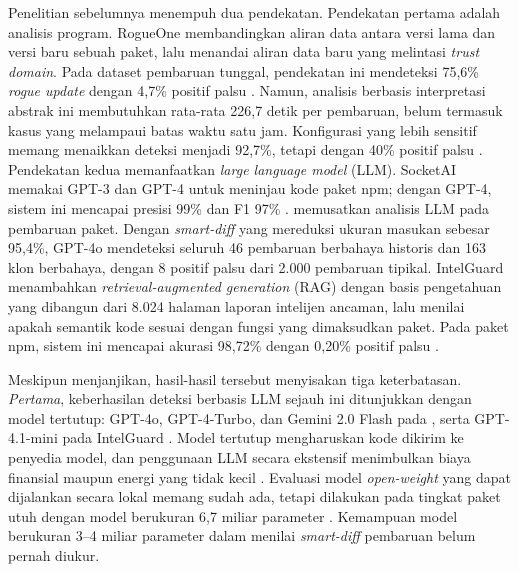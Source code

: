 \documentclass[a4paper,fleqn]{cas-dc}
\begin{document}
Penelitian sebelumnya menempuh dua pendekatan. Pendekatan pertama adalah analisis
program. RogueOne membandingkan aliran data antara versi lama dan versi baru
sebuah paket, lalu menandai aliran data baru yang melintasi \emph{trust domain}.
Pada dataset pembaruan tunggal, pendekatan ini mendeteksi 75,6\% \emph{rogue
update} dengan 4,7\% positif palsu \citep{sofaer2024rogueone}. Namun, analisis
berbasis interpretasi abstrak ini membutuhkan rata-rata 226,7 detik per
pembaruan, belum termasuk kasus yang melampaui batas waktu satu jam. Konfigurasi
yang lebih sensitif memang menaikkan deteksi menjadi 92,7\%, tetapi dengan 40\%
positif palsu \citep{sofaer2024rogueone}. Pendekatan kedua memanfaatkan
\emph{large language model} (LLM). SocketAI memakai GPT-3 dan GPT-4 untuk
meninjau kode paket npm; dengan GPT-4, sistem ini mencapai presisi 99\% dan F1
97\% \citep{zahan2025leveraging}. \citet{wyss2025evaluating} memusatkan analisis
LLM pada pembaruan paket. Dengan \emph{smart-diff} yang mereduksi ukuran masukan
sebesar 95,4\%, GPT-4o mendeteksi seluruh 46 pembaruan berbahaya historis dan
163 klon berbahaya, dengan 8 positif palsu dari 2.000 pembaruan tipikal.
IntelGuard menambahkan \emph{retrieval-augmented generation} (RAG) dengan basis
pengetahuan yang dibangun dari 8.024 halaman laporan intelijen ancaman, lalu
menilai apakah semantik kode sesuai dengan fungsi yang dimaksudkan paket. Pada
paket npm, sistem ini mencapai akurasi 98,72\% dengan 0,20\% positif palsu
\citep{guo2026bridging}.

Meskipun menjanjikan, hasil-hasil tersebut menyisakan tiga keterbatasan.
\emph{Pertama}, keberhasilan deteksi berbasis LLM sejauh ini ditunjukkan dengan
model tertutup: GPT-4o, GPT-4-Turbo, dan Gemini 2.0 Flash pada
\citet{wyss2025evaluating}, serta GPT-4.1-mini pada IntelGuard
\citep{guo2026bridging}. Model tertutup mengharuskan kode dikirim ke penyedia
model, dan penggunaan LLM secara ekstensif menimbulkan biaya finansial maupun
energi yang tidak kecil \citep{wyss2025evaluating}. Evaluasi model
\emph{open-weight} yang dapat dijalankan secara lokal memang sudah ada, tetapi
dilakukan pada tingkat paket utuh dengan model berukuran 6,7 miliar parameter
\citep{nguyen2025taint}. Kemampuan model berukuran 3--4 miliar parameter dalam
menilai \emph{smart-diff} pembaruan belum pernah diukur.
\end{document}
